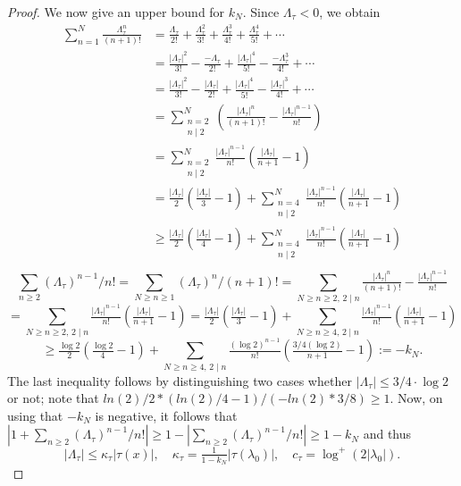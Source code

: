 \begin{proof}
We now give an upper bound for $k_N$. Since $\Lambda_\tau<0$, we obtain
\begin{align*}
\sum_{n = 1}^N \frac{\Lambda_\tau^{n}}{(n+1)!}
	& = \frac{\Lambda_\tau}{2!}+ \frac{\Lambda_\tau^{2}}{3!}+\frac{\Lambda_\tau^{3}}{4!} + \frac{\Lambda_\tau^{4}}{5!} + \cdots\\
	& =  \frac{|\Lambda_\tau|^{2}}{3!} - \frac{-\Lambda_\tau}{2!}+\frac{|\Lambda_\tau|^{4}}{5!} -\frac{-\Lambda_\tau^{3}}{4!} + \cdots\\
	& =  \frac{|\Lambda_\tau|^{2}}{3!} - \frac{|\Lambda_\tau|}{2!}+\frac{|\Lambda_\tau|^{4}}{5!} -\frac{|\Lambda_\tau|^{3}}{4!} + \cdots\\
	& = \sum_{\substack{n = 2 \\ n \mid 2}}^N \left(\frac{|\Lambda_\tau|^{n}}{(n+1)!} - \frac{|\Lambda_\tau|^{n-1}}{n!}\right)\\
	& = \sum_{\substack{n = 2 \\ n \mid 2}}^N \frac{|\Lambda_\tau|^{n-1}}{n!}\left(\frac{|\Lambda_\tau|}{n+1} - 1\right)\\
	& =  \frac{|\Lambda_\tau|}{2}\left(\frac{|\Lambda_\tau|}{3} - 1\right)+ \sum_{\substack{n = 4 \\ n \mid 2}}^N \frac{|\Lambda_\tau|^{n-1}}{n!}\left(\frac{|\Lambda_\tau|}{n+1} - 1\right)\\
	& \geq  \frac{|\Lambda_\tau|}{2}\left(\frac{|\Lambda_\tau|}{4} - 1\right)+ \sum_{\substack{n = 4 \\ n \mid 2}}^N \frac{|\Lambda_\tau|^{n-1}}{n!}\left(\frac{|\Lambda_\tau|}{n+1} - 1\right)\\
\end{align*}
$$\sum_{n\geq 2} (\Lambda_\tau)^{n-1}/n!=\sum_{N\geq n\geq 1} (\Lambda_\tau)^{n}/(n+1)!=\sum_{N\geq n\geq 2, \, 2\mid n}\tfrac{|\Lambda_\tau|^n}{(n+1)!}-\tfrac{|\Lambda_\tau|^{n-1}}{n!}$$
$$=\sum_{N\geq n\geq 2, \, 2\mid n}\tfrac{|\Lambda_\tau|^{n-1}}{n!}(\tfrac{|\Lambda_\tau|}{n+1}-1)=\tfrac{|\Lambda_\tau|}{2}(\tfrac{|\Lambda_\tau|}{3}-1)+\sum_{N\geq n\geq 4, \, 2\mid n}\tfrac{|\Lambda_\tau|^{n-1}}{n!}(\tfrac{|\Lambda_\tau|}{n+1}-1)$$
$$\geq \tfrac{\log 2}{2}(\tfrac{\log 2}{4}-1)+\sum_{N\geq n\geq 4, \, 2\mid n}\tfrac{(\log 2)^{n-1}}{n!}(\tfrac{3/4(\log 2)}{n+1}-1):=-k_N.$$
The last inequality follows by distinguishing two cases whether  $|\Lambda_\tau|\leq 3/4\cdot \log 2$ or not; note that $ln(2)/2*(ln(2)/4-1)/(-ln (2)*3/8)\geq 1$.  Now, on using that $-k_N$ is negative, it follows that $|1+\sum_{n\geq 2} (\Lambda_\tau)^{n-1}/n!|\geq 1-|\sum_{n\geq 2} (\Lambda_\tau)^{n-1}/n!|\geq 1-k_N$ and thus 
$$|\Lambda_\tau|\leq \kappa_\tau|\tau(x)|, \quad \kappa_\tau=\tfrac{1}{1-k_N}|\tau(\lambda_0)|,  \quad c_\tau=\log^+(2|\lambda_0|).$$


\end{proof}
